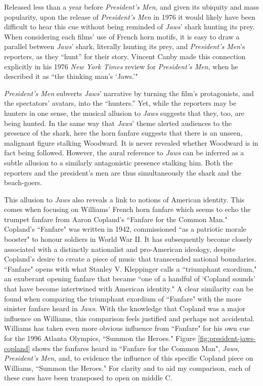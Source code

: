 Released less than a year before \textit{President’s Men}, and given its ubiquity and mass popularity, upon the release of \textit{President’s Men }in 1976 it would likely have been difficult to hear this cue without being reminded of \textit{Jaws}’ shark hunting its prey.
When considering each films’ use of French horn motifs, it is easy to draw a parallel between \textit{Jaws}’ shark, literally hunting its prey, and \textit{President’s Men}’s reporters, as they ``hunt” for their story.
Vincent Canby made this connection explicitly in his 1976 \textit{New York Times} review for \textit{President’s Men}, when he described it as ``the thinking man’s `Jaws.’"\autocites[][]{canby_presidents_1976}

\textit{President’s Men} subverts \textit{Jaws}’ narrative by turning the film's protagonists, and the spectators' avatars, into the ``hunters.”
Yet, while the reporters may be hunters in one sense, the musical allusion to \textit{Jaws} suggests that they, too, are being hunted.
In the same way that \textit{Jaws}’ theme alerted audiences to the presence of the shark, here the horn fanfare suggests that there is an unseen, malignant figure stalking Woodward.
It is never revealed whether Woodward is in fact being followed.
However, the aural reference to \textit{Jaws} can be inferred as a subtle allusion to a similarly antagonistic presence stalking him.
Both the reporters and the president’s men are thus simultaneously the shark and the beach-goers.

This allusion to \textit{Jaws} also reveals a link to notions of American identity.
This comes when focusing on Williams' French horn fanfare which seems to echo the trumpet fanfare from Aaron Copland's ``Fanfare for the Common Man."
Copland's ``Fanfare" was written in 1942, commissioned ``as a patriotic morale booster" to honour soldiers in World War II.\autocites[][5]{pollack_copland_2005}
It has subsequently become closely associated with a distinctly nationalist and pro-American ideology, despite Copland's desire to create a piece of music that transcended national boundaries.
``Fanfare" opens with what Stanley V. Kleppinger calls a ``triumphant exordium," an exuberant opening fanfare that became ``one of a handful of `Copland sounds' that have become intertwined with American identity."
A clear similarity can be found when comparing the triumphant exordium of ``Fanfare" with the more sinister fanfare heard in \textit{Jaws}.
With the knowledge that Copland was a major influence on Williams, this comparison feels justified and perhaps not accidental.\autocites[Emilio Audissino discusses the influence of Copland on Williams, claiming that ``Williams was also influenced by Copland's Americana dialect–pandiatonicism and quartel harmony–especially in his American themes."][139]{audissino_film_2021}
Williams has taken even more obvious influence from ``Fanfare" for his own cue for the 1996 Atlanta Olympics, ``Summon the Heroes."
Figure \ref{fig:president-jaws-copland} shows the fanfares heard in ``Fanfare for the Common Man", \textit{Jaws}, \textit{President's Men}, and, to evidence the influence of this specific Copland piece on Williams, ``Summon the Heroes."
For clarity and to aid my comparison, each of these cues have been transposed to open on middle C.

